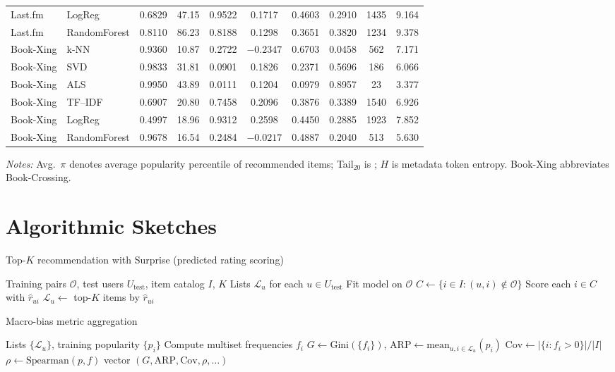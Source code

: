 \documentclass[11pt,a4paper,twoside,openright]{report}
\newcommand{\file}[1]{\texttt{\detokenize{#1}}}
\begin{document}
{\begin{longtable}{@{}llcccccccc@{}}
  Last.fm & LogReg & 0.6829 & 47.15 & 0.9522 & 0.1717 & 0.4603 & 0.2910 & 1435 & 9.164 \\
  Last.fm & RandomForest & 0.8110 & 86.23 & 0.8188 & 0.1298 & 0.3651 & 0.3820 & 1234 & 9.378 \\
  \midrule
  Book-Xing & k-NN & 0.9360 & 10.87 & 0.2722 & $-0.2347$ & 0.6703 & 0.0458 & 562 & 7.171 \\
  Book-Xing & SVD & 0.9833 & 31.81 & 0.0901 & 0.1826 & 0.2371 & 0.5696 & 186 & 6.066 \\
  Book-Xing & ALS & 0.9950 & 43.89 & 0.0111 & 0.1204 & 0.0979 & 0.8957 & 23 & 3.377 \\
  Book-Xing & TF--IDF & 0.6907 & 20.80 & 0.7458 & 0.2096 & 0.3876 & 0.3389 & 1540 & 6.926 \\
  Book-Xing & LogReg & 0.4997 & 18.96 & 0.9312 & 0.2598 & 0.4450 & 0.2885 & 1923 & 7.852 \\
  Book-Xing & RandomForest & 0.9678 & 16.54 & 0.2484 & $-0.0217$ & 0.4887 & 0.2040 & 513 & 5.630 \\
\end{longtable}
}
\noindent\textit{Notes:} Avg.~$\pi$ denotes average popularity percentile of recommended items; Tail$_{20}$ is \file{long\_tail\_share\_20pct}; $H$ is metadata token entropy. Book-Xing abbreviates Book-Crossing.

\chapter{Algorithmic Sketches}

\begin{algorithm}[htbp]
  \caption{Top-$K$ recommendation with Surprise (predicted rating scoring)}
  \label{alg:surprise-topk}
  \begin{algorithmic}[1]
    \Require Training pairs $\mathcal{O}$, test users $U_{\text{test}}$, item catalog $I$, $K$
    \Ensure Lists $\mathcal{L}_u$ for each $u \in U_{\text{test}}$
    \State Fit model on $\mathcal{O}$
      \State $C \gets \{ i \in I : (u,i) \notin \mathcal{O} \}$
      \State Score each $i \in C$ with $\hat{r}_{ui}$
      \State $\mathcal{L}_u \gets$ top-$K$ items by $\hat{r}_{ui}$
    \EndFor
  \end{algorithmic}
\end{algorithm}

\begin{algorithm}[htbp]
  \caption{Macro-bias metric aggregation}
  \label{alg:macro}
  \begin{algorithmic}[1]
    \Require Lists $\{\mathcal{L}_u\}$, training popularity $\{p_i\}$
    \State Compute multiset frequencies $f_i$
    \State $G \gets \text{Gini}(\{f_i\})$, $\mathrm{ARP} \gets \text{mean}_{u,i\in\mathcal{L}_u}(p_i)$
    \State $\mathrm{Cov} \gets |\{i: f_i>0\}| / |I|$
    \State $\rho \gets \mathrm{Spearman}(p, f)$
    \State \Return vector $(G,\mathrm{ARP},\mathrm{Cov},\rho,\ldots)$
  \end{algorithmic}
\end{algorithm}



\end{document}
